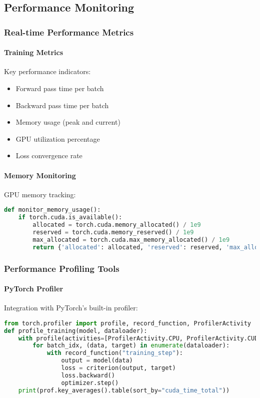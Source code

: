 \subsection{Performance Monitoring}

\subsubsection{Real-time Performance Metrics}

\paragraph{Training Metrics}
Key performance indicators:
\begin{itemize}
    \item Forward pass time per batch
    \item Backward pass time per batch
    \item Memory usage (peak and current)
    \item GPU utilization percentage
    \item Loss convergence rate
\end{itemize}

\paragraph{Memory Monitoring}
GPU memory tracking:

\begin{lstlisting}[language=python, caption=Memory Monitoring]
def monitor_memory_usage():
    if torch.cuda.is_available():
        allocated = torch.cuda.memory_allocated() / 1e9
        reserved = torch.cuda.memory_reserved() / 1e9
        max_allocated = torch.cuda.max_memory_allocated() / 1e9
        return {'allocated': allocated, 'reserved': reserved, 'max_allocated': max_allocated}
\end{lstlisting}

\subsubsection{Performance Profiling Tools}

\paragraph{PyTorch Profiler}
Integration with PyTorch's built-in profiler:

\begin{lstlisting}[language=python, caption=PyTorch Profiler]
from torch.profiler import profile, record_function, ProfilerActivity
def profile_training(model, dataloader):
    with profile(activities=[ProfilerActivity.CPU, ProfilerActivity.CUDA]) as prof:
        for batch_idx, (data, target) in enumerate(dataloader):
            with record_function("training_step"):
                output = model(data)
                loss = criterion(output, target)
                loss.backward()
                optimizer.step()
    print(prof.key_averages().table(sort_by="cuda_time_total"))
\end{lstlisting}

